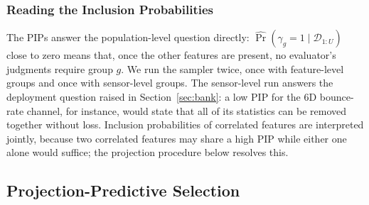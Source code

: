\documentclass[lettersize,journal]{IEEEtran}
\newcommand{\D}{\mathcal{D}}
\begin{document}
\subsubsection{Reading the Inclusion Probabilities}
The PIPs answer the population-level question directly: $\widehat{\Pr}(\gamma_g=1\mid\D_{1:U})$ close to zero means that, once the other features are present, no evaluator's judgments require group $g$. We run the sampler twice, once with feature-level groups and once with sensor-level groups. The sensor-level run answers the deployment question raised in Section~\ref{sec:bank}: a low PIP for the 6D bounce-rate channel, for instance, would state that all of its statistics can be removed together without loss. Inclusion probabilities of correlated features are interpreted jointly, because two correlated features may share a high PIP while either one alone would suffice; the projection procedure below resolves this.

\subsection{Projection-Predictive Selection}
\label{sec:projpred}
\end{document}
